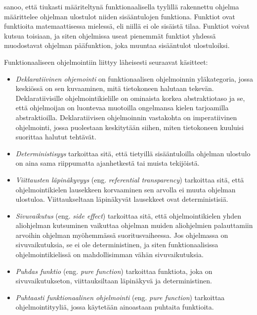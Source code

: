 \citet{scott2009programming} sanoo, että tiukasti määriteltynä funktionaalisella tyylillä rakennettu ohjelma määrittelee ohjelman ulostulot niiden sisääntulojen funktiona. Funktiot ovat funktioita matemaattisessa mielessä, eli niillä ei ole sisäistä tilaa. Funktiot voivat kutsua toisiaan, ja siten ohjelmissa useat pienemmät funktiot yhdessä muodostavat ohjelman pääfunktion, joka muuntaa sisääntulot ulostuloiksi.

Funktionaaliseen ohjelmointiin liittyy läheisesti seuraavat käsitteet:
\begin{itemize}
	\item \textit{Deklaratiivinen ohjemointi} on funktionaalisen ohjelmoinnin yläkategoria, jossa keskiössä on sen kuvaaminen, mitä tietokoneen halutaan tekevän. Deklaratiivisille ohjelmointikielille on ominaista korkea abstraktiotaso ja se, että ohjelmoijan on luontevaa muotoilla ongelmansa kielen tarjoamilla abstraktioilla. Deklaratiivisen ohjelmoinnin vastakohta on imperatiivinen ohjelmointi, jossa puolestaan keskitytään siihen, miten tietokoneen kuuluisi suorittaa halutut tehtävät.

	\item \textit{Deterministisyys} tarkoittaa sitä, että tietyillä sisääntuloilla ohjelman ulostulo on aina sama riippumatta ajanhetkestä tai muista tekijöistä.

	\item \textit{Viittausten läpinäkyvyys} (eng. \textit{referential transparency}) tarkoittaa sitä, että ohjelmointikielen lausekkeen korvaaminen sen arvolla ei muuta ohjelman ulostuloa. Viittaukseltaan läpinäkyvät lausekkeet ovat deterministisiä.

	\item \textit{Sivuvaikutus} (eng. \textit{side effect}) tarkoittaa sitä, että ohjelmointikielen yhden aliohjelman kutsuminen vaikuttaa ohjelman muiden aliohjelmien palauttamiin arvoihin ohjelman myöhemmässä suoritusvaiheessa. Jos ohjelmassa on sivuvaikutuksia, se ei ole deterministinen, ja siten funktionaalisissa ohjelmointikielissä on mahdollisimman vähän sivuvaikutuksia.

	\item \textit{Puhdas funktio} (eng. \textit{pure function}) tarkoittaa funktiota, joka on sivuvaikutukseton, viittauksiltaan läpinäkyvä ja deterministinen.

	\item \textit{Puhtaasti funktionaalinen ohjelmointi} (eng. \textit{pure function}) tarkoittaa ohjelmointityyliä, jossa käytetään ainoastaan puhtaita funktioita.
\end{itemize}

